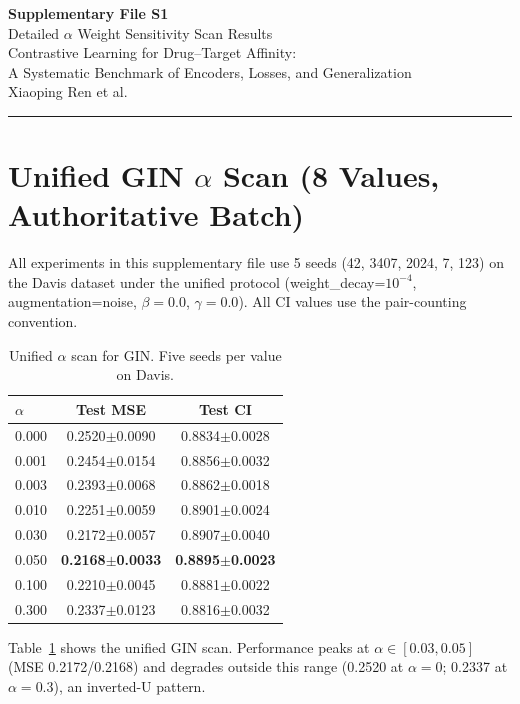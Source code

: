 \documentclass[10pt,a4paper]{article}
\begin{document}
\begin{center}
{\Large\bfseries Supplementary File S1}\\[0.5em]
{\large Detailed $\alpha$ Weight Sensitivity Scan Results}\\[1em]
Contrastive Learning for Drug--Target Affinity:\\A Systematic Benchmark of Encoders, Losses, and Generalization\\[0.5em]
Xiaoping Ren et al.
\end{center}

\noindent\rule{\linewidth}{1pt}
\vspace{1em}

\section{Unified GIN $\alpha$ Scan (8 Values, Authoritative Batch)}

All experiments in this supplementary file use 5 seeds (42, 3407, 2024, 7, 123) on the Davis dataset under the unified protocol (weight\_decay=$10^{-4}$, augmentation=noise, $\beta=0.0$, $\gamma=0.0$). All CI values use the pair-counting convention.

\begin{table}[!h]
\caption{Unified $\alpha$ scan for GIN. Five seeds per value on Davis.}
\label{tab:alpha_fine_gin}
\centering
\begin{tabular}{lcc}
\toprule
$\alpha$ & Test MSE & Test CI \\
\midrule
0.000 & 0.2520$\pm$0.0090 & 0.8834$\pm$0.0028 \\
0.001 & 0.2454$\pm$0.0154 & 0.8856$\pm$0.0032 \\
0.003 & 0.2393$\pm$0.0068 & 0.8862$\pm$0.0018 \\
0.010 & 0.2251$\pm$0.0059 & 0.8901$\pm$0.0024 \\
0.030 & 0.2172$\pm$0.0057 & 0.8907$\pm$0.0040 \\
0.050 & \textbf{0.2168$\pm$0.0033} & \textbf{0.8895$\pm$0.0023} \\
0.100 & 0.2210$\pm$0.0045 & 0.8881$\pm$0.0022 \\
0.300 & 0.2337$\pm$0.0123 & 0.8816$\pm$0.0032 \\
\bottomrule
\end{tabular}
\end{table}

Table~\ref{tab:alpha_fine_gin} shows the unified GIN scan. Performance peaks at $\alpha \in [0.03, 0.05]$ (MSE 0.2172/0.2168) and degrades outside this range (0.2520 at $\alpha=0$; 0.2337 at $\alpha=0.3$), an inverted-U pattern.
\end{document}
